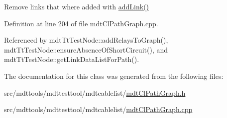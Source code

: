 Remove links that where added with \hyperlink{classmdt_cl_path_graph_a14a5580402b273eb6707939ee122fa95}{add\-Link()} 



Definition at line 204 of file mdt\-Cl\-Path\-Graph.\-cpp.



Referenced by mdt\-Tt\-Test\-Node\-::add\-Relays\-To\-Graph(), mdt\-Tt\-Test\-Node\-::ensure\-Absence\-Of\-Short\-Circuit(), and mdt\-Tt\-Test\-Node\-::get\-Link\-Data\-List\-For\-Path().



The documentation for this class was generated from the following files\-:\begin{DoxyCompactItemize}
\item 
src/mdttools/mdttesttool/mdtcablelist/\hyperlink{mdt_cl_path_graph_8h}{mdt\-Cl\-Path\-Graph.\-h}\item 
src/mdttools/mdttesttool/mdtcablelist/\hyperlink{mdt_cl_path_graph_8cpp}{mdt\-Cl\-Path\-Graph.\-cpp}\end{DoxyCompactItemize}
